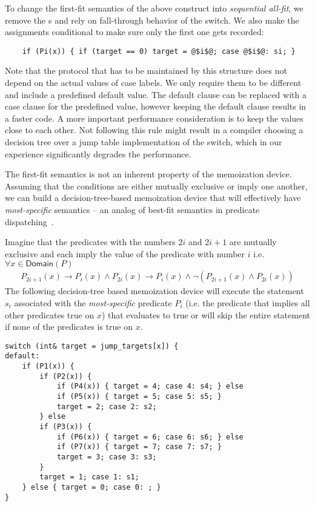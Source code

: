 To change the first-fit semantics of the above construct into \emph{sequential 
all-fit}, we remove the s and rely on fall-through behavior of the 
switch. We also make the assignments conditional to make sure only the first one 
gets recorded:

\begin{lstlisting}
    if (Pi(x)) { if (target == 0) target = @$i$@; case @$i$@: si; }
\end{lstlisting}

\noindent
Note that the protocol that has to be maintained by this structure does not 
depend on the actual values of case labels. We only require them to be 
different and include a predefined default value. The default clause can be 
replaced with a case clause for the predefined value, however keeping the default  
clause results in a faster code. A more important performance consideration is to 
keep the values close to each other. Not following this rule might result in a 
compiler choosing a decision tree over a jump table implementation of the 
switch, which in our experience significantly degrades the performance.

The first-fit semantics is not an inherent property of the memoization device. 
Assuming that the conditions are either mutually exclusive or imply one another, we 
can build a decision-tree-based memoization device that will effectively have 
\emph{most-specific} semantics -- an analog of best-fit semantics in predicate 
dispatching~\cite{ErnstKC98}.

Imagine that the predicates with the numbers $2i$ and $2i+1$ are mutually exclusive and 
each imply the value of the predicate with number $i$ i.e. $\forall x \in \mathsf{Domain}(P)$
\begin{eqnarray*}
P_{2i+1}(x)\rightarrow P_i(x) \wedge P_{2i}(x)\rightarrow P_i(x) \wedge \neg(P_{2i+1}(x) \wedge P_{2i}(x))
\end{eqnarray*}
\noindent
The following decision-tree based memoization device will execute the statement 
$s_i$ associated with the \emph{most-specific} predicate $P_i$ (i.e. the 
predicate that implies all other predicates true on $x$) that evaluates to true or will 
skip the entire statement if none of the predicates is true on $x$.

\begin{lstlisting}
switch (int& target = jump_targets[x]) {
default:
    if (P1(x)) {
        if (P2(x)) {
            if (P4(x)) { target = 4; case 4: s4; } else
            if (P5(x)) { target = 5; case 5: s5; } 
            target = 2; case 2: s2;
        } else
        if (P3(x)) {
            if (P6(x)) { target = 6; case 6: s6; } else
            if (P7(x)) { target = 7; case 7: s7; } 
            target = 3; case 3: s3;
        }
        target = 1; case 1: s1;
    } else { target = 0; case 0: ; }
}
\end{lstlisting}


